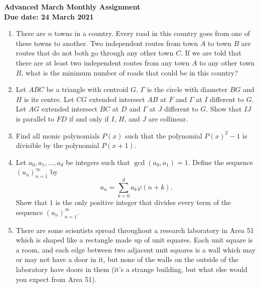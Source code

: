 \documentclass{article}
\begin{document}
\thispagestyle{empty}

\begin{center}
  \textbf{\Large Advanced March Monthly Assignment}
  \\ \vspace{1em}
  \textbf{\large Due date: 24 March 2021}
\end{center}

\vfill
\vfill

\begin{enumerate}[1.]

\vfill
\item %
There are $n$ towns in a country.
Every road in this country goes from one of these towns to another.
Two independent routes from town $A$ to town $B$ are routes that do not both go through any other town $C$.
If we are told that there are at least two independent routes from any town $A$ to any other town $B$, what is the minimum number of roads that could be in this country?


\vfill
\item %
Let $ABC$ be a triangle with centroid $G$.
$\Gamma$ is the circle with diameter $BG$ and $H$ is its centre.
Let $CG$ extended intersect $AB$ at $F$ and $\Gamma$ at $I$ different to $G$.
Let $AG$ extended intersect $BC$ at $D$ and $\Gamma$ at $J$ different to $G$. Show that $IJ$ is parallel to $FD$ if and only if $I$, $H$, and $J$ are collinear.


\vfill
\item %
Find all monic polynomials $P(x)$ such that the polynomial $P(x)^2-1$ is divisible by the polynomial $P(x+1)$.


\vfill
\item %
Let $a_0, a_1, \dots, a_d$ be integers such that $\gcd(a_0, a_1) = 1$. Define the sequence $(u_n)_{n=1}^{\infty}$ by
\[
  u_n = \sum_{k = 0}^{d} a_k \varphi(n + k).
\]
Show that $1$ is the only positive integer that divides every term of the sequence $(u_n)_{n = 1}^{\infty}$.


\vfill
\item %
There are some scientists spread throughout a research laboratory in Area 51 which is shaped like a rectangle made up of unit squares.
Each unit square is a room, and each edge between two adjacent unit squares is a wall which may or may not have a door in it, but none of the walls on the outside of the laboratory have doors in them (it's a strange building, but what else would you expect from Area 51).


\end{enumerate}
\end{document}
